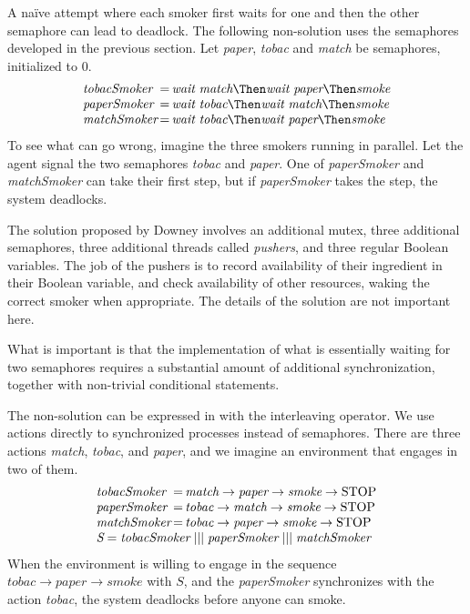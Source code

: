 A na\"ive attempt where each smoker first waits for one and then the other semaphore can lead to deadlock.
The following non-solution uses the semaphores developed in the previous section.
Let \emph{paper}, \emph{tobac} and \emph{match} be semaphores, initialized to 0.
\begin{equation*}
\begin{array}{l @{\,} c @{\,} l}
  \textit{tobacSmoker} & = & \textit{wait}\ \textit{match} \Then \textit{wait}\ \textit{paper} \Then \textit{smoke} \\
  \textit{paperSmoker} & = & \textit{wait}\ \textit{tobac} \Then \textit{wait}\ \textit{match} \Then \textit{smoke} \\
  \textit{matchSmoker} & = & \textit{wait}\ \textit{tobac} \Then \textit{wait}\ \textit{paper} \Then \textit{smoke} \\
\end{array}
\end{equation*}
To see what can go wrong, imagine the three smokers running in parallel.
Let the agent signal the two semaphores \emph{tobac} and \emph{paper}.
One of \emph{paperSmoker} and \emph{matchSmoker} can take their first step, but if \emph{paperSmoker} takes the step, the system deadlocks.

The solution proposed by Downey involves an additional mutex, three additional semaphores, three additional threads called \emph{pushers}, and three regular Boolean variables.
The job of the pushers is to record availability of their ingredient in their Boolean variable, and check availability of other resources, waking the correct smoker when appropriate.
The details of the solution are not important here.

What is important is that the implementation of what is essentially waiting for two semaphores requires a substantial amount of additional synchronization, together with non-trivial conditional statements.

The non-solution can be expressed in \CSP with the interleaving operator.
We use actions directly to synchronized processes instead of semaphores.
There are three actions \emph{match}, \emph{tobac}, and \emph{paper}, and we imagine an environment that engages in two of them.
\begin{equation*}
\begin{array}{l @{\,} c @{\,} l}
  \textit{tobacSmoker} & = & \textit{match} \to \textit{paper} \to \textit{smoke} \to \text{STOP} \\
  \textit{paperSmoker} & = & \textit{tobac} \to \textit{match} \to \textit{smoke} \to \text{STOP} \\
  \textit{matchSmoker} & = & \textit{tobac} \to \textit{paper} \to \textit{smoke} \to \text{STOP} \\
  \multicolumn{3}{l}{\textit{S} = \textit{tobacSmoker} \mathrel{|||} \textit{paperSmoker} \mathrel{|||} \textit{matchSmoker}} \\
\end{array}
\end{equation*}
When the environment is willing to engage in the sequence $\textit{tobac} \to \textit{paper} \to \textit{smoke}$ with $S$, and the \emph{paperSmoker} synchronizes with the action \emph{tobac}, the system deadlocks before anyone can smoke.

